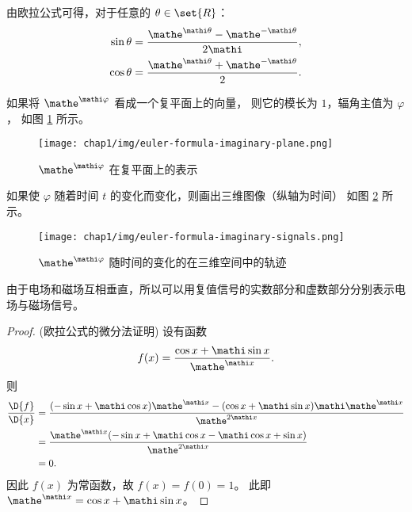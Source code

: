 \begin{corollary}
    由欧拉公式可得，对于任意的 $\theta \in \set{R}$：
    \begin{align*}
        \sin \theta & = \frac{\mathe^{\mathi\theta} - \mathe^{-\mathi\theta}}{2\mathi}, \\
        \cos \theta & = \frac{\mathe^{\mathi\theta} + \mathe^{-\mathi\theta}}{2}.
    \end{align*}
\end{corollary}

\begin{example}[复值信号的图示]
    如果将 $\mathe^{\mathi \varphi}$ 看成一个复平面上的向量，
    则它的模长为 $1$，辐角主值为 $\varphi$，
    如图 \ref{fig:euler-formula-imaginary-plane} 所示。
    \begin{figure}[H]
        \centering
        \texttt{[image: chap1/img/euler-formula-imaginary-plane.png]}
        \caption{$\mathe^{\mathi \varphi}$ 在复平面上的表示}
        \label{fig:euler-formula-imaginary-plane}
    \end{figure}

    如果使 $\varphi$ 随着时间 $t$ 的变化而变化，则画出三维图像（纵轴为时间）
    如图 \ref{fig:euler-formula-imaginary-signals.png} 所示。
    \begin{figure}[H]
        \centering
        \texttt{[image: chap1/img/euler-formula-imaginary-signals.png]}
        \caption{$\mathe^{\mathi \varphi}$ 随时间的变化的在三维空间中的轨迹}
        \label{fig:euler-formula-imaginary-signals.png}
    \end{figure}
\end{example}

\begin{example}[复值信号在电磁场中的应用]
    由于电场和磁场互相垂直，所以可以用复值信号的实数部分和虚数部分分别表示电场与磁场信号。
\end{example}

\begin{proof}
    (欧拉公式的微分法证明) 设有函数
    \begin{align*}
        f(x) = \frac{\cos x + \mathi \sin x}{\mathe^{\mathi x}}.
    \end{align*}
    则
    \begin{align*}
        \frac{\D{f}}{\D{x}} & = \frac{(-\sin x + \mathi \cos x)\mathe^{\mathi x}
                    - (\cos x + \mathi \sin x)\mathi \mathe^{\mathi x}}
                    {\mathe^{2\mathi x}} \\
        & = \frac{\mathe^{\mathi x}(-\sin x + \mathi \cos x - \mathi \cos x + \sin x)}{\mathe^{2\mathi x}} \\
        & = 0.
    \end{align*}
    因此 $f(x)$ 为常函数，故 $f(x) = f(0) = 1$。
    此即 $\mathe^{\mathi x} = \cos x + \mathi \sin x$。
\end{proof}

